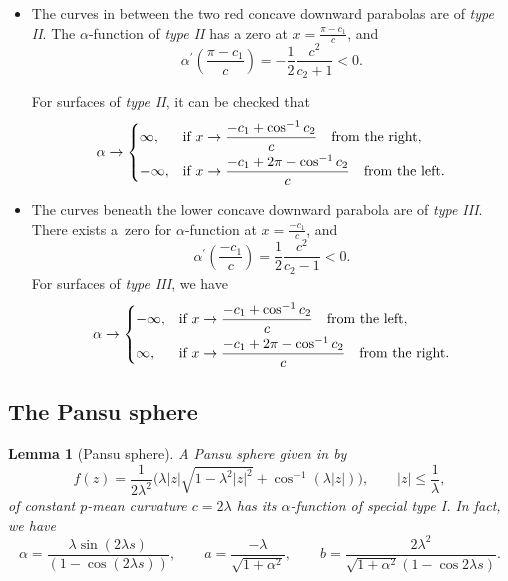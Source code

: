 \documentclass[pdftex]{sigma}
\numberwithin{equation}{section}
\newtheorem{Lemma}[Theorem]{Lemma}
\begin{document}
\begin{itemize}
\item The curves in between the two red concave downward parabolas are
of \emph{type II}. The $\alpha$-function of \emph{type II} has a zero at
$x=\frac{\pi-c_1}{c}$, and
\[
\alpha^{\prime }\left(\frac{\pi-c_1}{c}\right)=-\frac{1}{2}\frac{c^2}{c_{2}+1}<0.
\]

For surfaces of \emph{type II}, it can be checked that
\begin{equation*}
\alpha \rightarrow \begin{cases}
\infty, & \text{if}\ x\rightarrow \dfrac{-c_{1}+\cos^{-1}c_2}{c}\quad \text{from the right}, \vspace{1mm}\\
-\infty, & \text{if}\ x\rightarrow \dfrac{-c_{1}+2\pi-\cos^{-1}c_2}{c}\quad
\text{from the left}.
\end{cases}
\end{equation*}

\item The curves beneath the lower concave downward parabola are of \emph{type III}. There exists a~zero for $\alpha$-function at $x=\frac{-c_{1}}{c}$, and
\[
\alpha^{\prime }\left(\frac{-c_1}{c}\right)=\frac{1}{2}\frac{c^2}{c_{2}-1}<0.
\]
For surfaces of \emph{type III}, we have
\begin{equation*}
\alpha \rightarrow\begin{cases}
-\infty, & \text{if}\ x\rightarrow \dfrac{-c_{1}+\cos^{-1}c_2}{c}\quad \text{from the left}, \vspace{1mm}\\
\infty, & \text{if}\ x\rightarrow \dfrac{-c_{1}+2\pi-\cos^{-1}c_2}{c}\quad
\text{from the right}.
\end{cases}
\end{equation*}
\end{itemize}

\subsection{The Pansu sphere}\label{pansu1}

\begin{Lemma}[Pansu sphere]
A Pansu sphere given in {\rm\cite{ChengJ/ChiuH/HwangJ/YangP:2018}} by
\begin{equation}\label{pansusphere}
f(z)=\frac{1}{2\lambda^2}\bigl(\lambda|z|\sqrt{1-\lambda^2|z|^2}+\cos^{-1}(\lambda|z|)\bigr),\qquad |z|\leq \frac{1}{\lambda},
\end{equation}
of constant $p$-mean curvature $c=2\lambda$ has its $\alpha$-function of special type I. In fact, we have
\begin{equation*}
\alpha=\frac{\lambda \sin(2\lambda s)}{(1-\cos(2\lambda s))},\qquad a=\frac{-\lambda}{\sqrt{1+\alpha^2}},\qquad b=\frac{2\lambda^{2}}{\sqrt{1+\alpha^2}(1-\cos{2\lambda s})}.
\end{equation*}
\end{Lemma}
\end{document}
